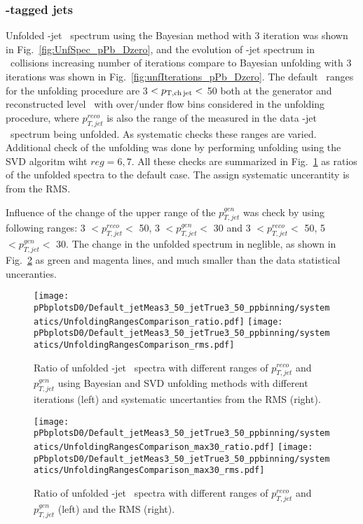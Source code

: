 \subsubsection{\Dzero-tagged jets}

Unfolded \Dzero-jet \pt\ spectrum using the Bayesian method with 3 iteration was shown in Fig.~\ref{fig:UnfSpec_pPb_Dzero}, and the evolution of \Dzero-jet spectrum in \pPb\ collisions increasing number of iterations compare to Bayesian unfolding with 3 iterations was shown in Fig.~\ref{fig:unfIterations_pPb_Dzero}. 
The default \ptchjet\ ranges for the unfolding procedure are 3 $< p_{\mathrm{T,ch\, jet}}< $ 50 both at the generator and reconstructed level \pt\, with over/under flow bins considered in the unfolding procedure, where $p_{T,jet}^{reco}$ is also the range of the measured in the data \Dzero-jet \pt\ spectrum being unfolded. 
As systematic checks these ranges are varied.
Additional check of the unfolding was done by performing unfolding using the SVD algoritm wiht $reg=6,7$.
All these checks are summarized in Fig.~\ref{fig:UnfSpec_pPb_Dzero_ranges} as ratios of the unfolded spectra to the default case. The assign systematic uncerantity is from the RMS.

Influence of the change of the upper range of the $p_{T,jet}^{gen}$ was check by using following ranges:  3 $<  p_{T,jet}^{reco} < $ 50, 3 $<  p_{T,jet}^{gen} < $ 30 and 3 $<  p_{T,jet}^{reco} < $ 50, 5 $<  p_{T,jet}^{gen} < $ 30. The change in the unfolded spectrum in neglible, as shown in Fig.~\ref{fig:UnfSpec_pPb_Dzero_ranges_max30} as green and magenta lines, and much smaller than the data statistical unceranties. 

\begin{figure}[bth]
\centering
\texttt{[image: pPbplotsD0/Default\_jetMeas3\_50\_jetTrue3\_50\_ppbinning/systematics/UnfoldingRangesComparison\_ratio.pdf]}
\texttt{[image: pPbplotsD0/Default\_jetMeas3\_50\_jetTrue3\_50\_ppbinning/systematics/UnfoldingRangesComparison\_rms.pdf]}
\caption{Ratio of unfolded \Dzero-jet \pt\ spectra with different ranges of $p_{T,jet}^{reco}$ and $p_{T,jet}^{gen}$ using Bayesian and SVD unfolding methods with different iterations (left) and systematic uncertanties from the RMS (right).}
\label{fig:UnfSpec_pPb_Dzero_ranges}
\end{figure}

\begin{figure}[bth]
\centering
\texttt{[image: pPbplotsD0/Default\_jetMeas3\_50\_jetTrue3\_50\_ppbinning/systematics/UnfoldingRangesComparison\_max30\_ratio.pdf]}
\texttt{[image: pPbplotsD0/Default\_jetMeas3\_50\_jetTrue3\_50\_ppbinning/systematics/UnfoldingRangesComparison\_max30\_rms.pdf]}
\caption{Ratio of unfolded \Dzero-jet \pt\ spectra with different ranges of $p_{T,jet}^{reco}$ and $p_{T,jet}^{gen}$  (left) and the RMS (right).}
\label{fig:UnfSpec_pPb_Dzero_ranges_max30}
\end{figure}

